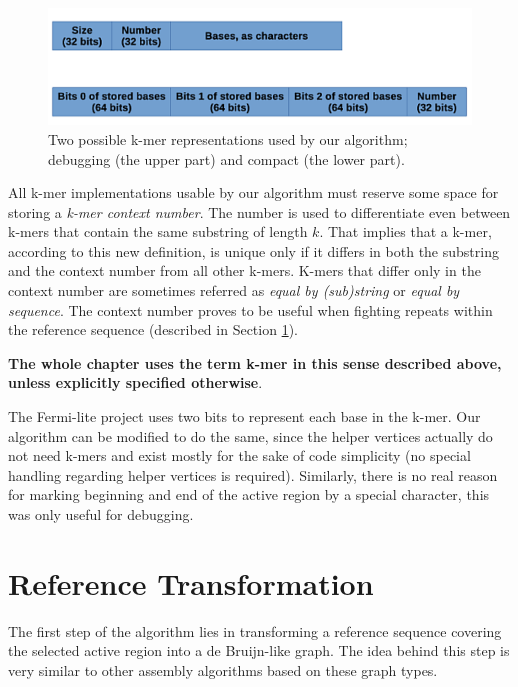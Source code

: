 \begin{figure}[h]
	\centering
	\includegraphics{img/kmer-representations}
	\caption{Two possible k-mer representations used by our algorithm; debugging (the upper part) and compact (the lower part).}
	\label{fig:kmer-representations}
\end{figure}

All k-mer implementations usable by our algorithm must reserve some space for storing a \textit{k-mer context number}. The number is used to differentiate even between k-mers that contain the same substring of length $k$. That implies that a k-mer, according to this new definition, is unique only if it differs in both the substring and the context number from all other k-mers. K-mers that differ only in the context number are sometimes referred as \textit{equal by (sub)string} or \textit{equal by sequence}. The context number proves to be useful when fighting repeats within the reference sequence (described in Section \ref{sec:reference-transformation}).

\textbf{The whole chapter uses the term k-mer in this sense described above, unless explicitly specified otherwise}.

The Fermi-lite project uses two bits to represent each base in the k-mer. Our algorithm can be modified to do the same, since the helper vertices actually do not need k-mers and exist mostly for the sake of code simplicity (no special handling regarding helper vertices is required). Similarly, there is no real reason for marking beginning and end of the active region by a special character, this was only useful for debugging.

\section{Reference Transformation}
\label{sec:reference-transformation}

The first step of the algorithm lies in transforming a reference sequence covering the selected active region into a de Bruijn-like graph. The idea behind this step is very similar to other assembly algorithms based on these graph types. 

